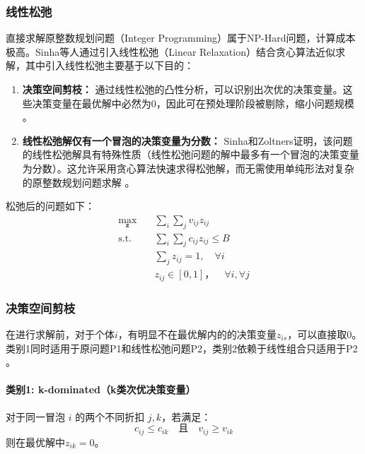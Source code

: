 \subsubsection{线性松弛}
直接求解原整数规划问题（Integer Programming）属于NP-Hard问题，计算成本极高。Sinha等人通过引入线性松弛（Linear Relaxation）结合贪心算法近似求解，其中引入线性松弛主要基于以下目的：
\begin{enumerate}
    \item \textbf{决策空间剪枝：} 通过线性松弛的凸性分析，可以识别出次优的决策变量。这些决策变量在最优解中必然为0，因此可在预处理阶段被剔除，缩小问题规模 \citep{sinha1979multiple}。

    \item \textbf{线性松弛解仅有一个冒泡的决策变量为分数：} Sinha和Zoltners证明，该问题的线性松弛解具有特殊性质（线性松弛问题的解中最多有一个冒泡的决策变量为分数）。这允许采用贪心算法快速求得松弛解，而无需使用单纯形法对复杂的原整数规划问题求解 \citep{sinha1979multiple}。
    
\end{enumerate}


松弛后的问题如下：
\begin{equation} \label{eq:smckp}
\begin{aligned}
\max_{\bm{z}} \quad &  \sum_{i} \sum_{j} v_{ij} z_{ij} \\
\text{s.t.} \quad & \sum_{i}\sum_{j} c_{ij} z_{ij} \le B  \\
& \sum_{j} z_{ij} = 1, \quad \forall i \\
& z_{ij} \in [0, 1]，\quad \forall i,\forall j
\end{aligned}
\end{equation}\par





\subsubsection{决策空间剪枝}

在进行求解前，对于个体$i$，有明显不在最优解内的的决策变量$z_{is}$，可以直接取0。
类别1同时适用于原问题P1和线性松弛问题P2，类别2依赖于线性组合只适用于P2 \citep{sinha1979multiple}。





\paragraph{类别1: k-dominated（k类次优决策变量）}
对于同一冒泡 $i$ 的两个不同折扣 $j, k$，若满足：
$$ c_{ij} \le c_{ik} \quad \text{且} \quad v_{ij} \ge v_{ik} $$
则在最优解中$z_{ik}=0$。

